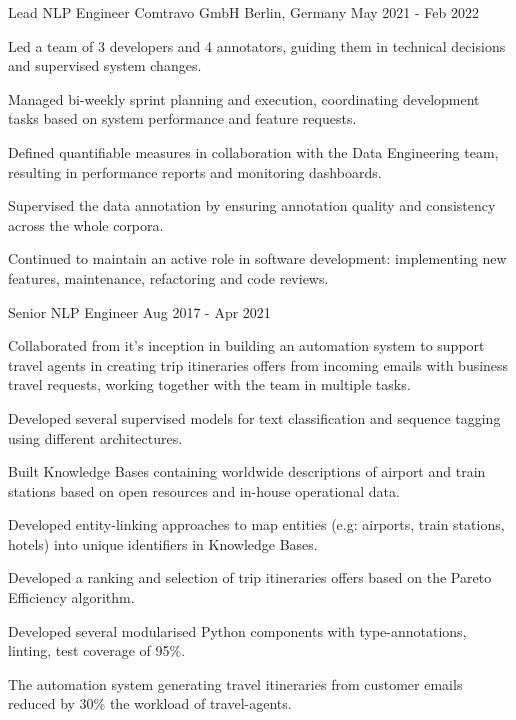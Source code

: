 \begin{cventries}

\cventry
    {Lead NLP Engineer} 
    {Comtravo GmbH} 
    {Berlin, Germany} 
    {May 2021 - Feb 2022}
    {
      \begin{cvitems} 
		  \item {Led a team of 3 developers and 4 annotators, guiding them in technical decisions and supervised system changes.}
		  \item {Managed bi-weekly sprint planning and execution, coordinating development tasks based on system performance and feature requests.}
		  \item {Defined quantifiable measures in collaboration with the Data Engineering team, resulting in performance reports and monitoring dashboards.}
		  \item {Supervised the data annotation by ensuring annotation quality and consistency across the whole corpora.}
		  \item {Continued to maintain an active role in software development: implementing new features, maintenance, refactoring and code reviews.}
        \end{cvitems}
 	}


  \cventry
    {Senior NLP Engineer}
    {} %
    {} %
    {Aug 2017 - Apr 2021} %
    {
      \begin{cvitems}
		\item {Collaborated from it's inception in building an automation system to support travel agents in creating trip itineraries offers from incoming emails with business travel requests, working together with the team in multiple tasks.}
		\item {Developed several supervised models for text classification and sequence tagging using different architectures.}
		\item {Built Knowledge Bases containing worldwide descriptions of airport and train stations based on open resources and in-house operational data.}
		\item {Developed entity-linking approaches to map entities (e.g: airports, train stations, hotels) into unique identifiers in Knowledge Bases.}
		\item {Developed a ranking and selection of trip itineraries offers based on the Pareto Efficiency algorithm.}
		\item {Developed several modularised Python components with type-annotations, linting, test coverage of 95\%.}
		\item {The automation system generating travel itineraries from customer emails reduced by 30\% the workload of travel-agents.}
        \end{cvitems}
 	}


\end{cventries}
